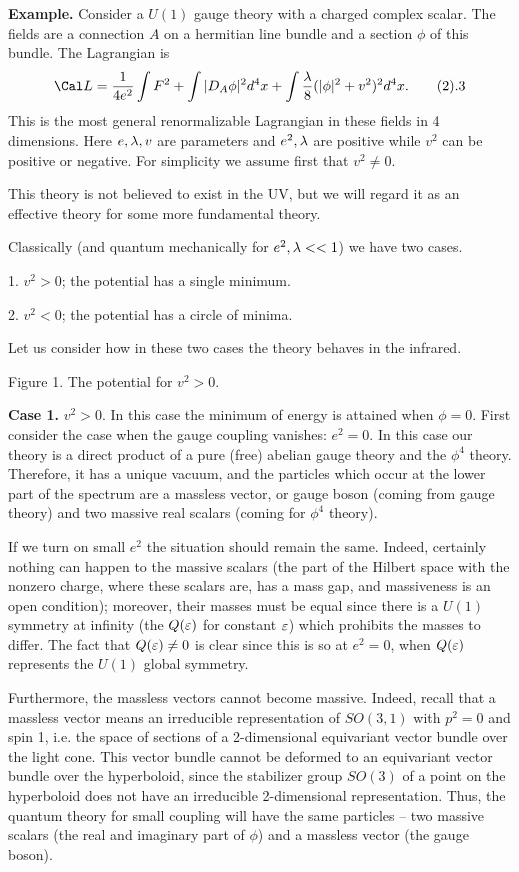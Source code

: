 {\bf Example.} Consider a $U(1)$ gauge theory with a charged 
complex scalar. The fields are a connection $A$ on a hermitian line bundle 
and a section $\phi$ of this bundle. The Lagrangian is 
$$
\Cal L=\frac{1}{4e^2}\int F^2+\int |D_A\phi|^2d^4x+\int\frac{\l}{8}
(|\phi|^2+v^2)^2d^4x.\tag 2.3 
$$
This is the most general renormalizable Lagrangian in these fields in 
4 dimensions. Here $e,\lambda,v$ are parameters and $e^2,\lambda$ are positive while 
$v^2$ can be positive or negative. For simplicity we assume first 
that $v^2\ne 0$. 

This theory is not believed to exist in the UV, but we will regard it 
 as an effective theory for some more fundamental theory. 

Classically (and quantum mechanically for $e^2,\lambda<<1$) we have two cases. 

1. $v^2>0$; the potential has a single minimum. 

2. $v^2<0$; the potential has a circle of minima. 

Let us consider how in these two cases the theory behaves in the infrared. 

\centerline{\epsfxsize=2in}
\centerline{Figure 1. The potential for $v^2>0$.}

\bigskip

{\bf Case 1.} $v^2>0$. In this case the minimum of energy is attained when 
$\phi=0$. First consider the case when the gauge coupling vanishes: 
$e^2=0$. In this case our theory is a direct product of a pure (free) 
abelian gauge theory and the $\phi^4$ theory. Therefore, it has a unique 
vacuum, and    
the particles which occur at the lower part of the spectrum are 
a massless vector, or gauge boson 
(coming from gauge theory) and two massive real scalars
(coming for $\phi^4$ theory). 

If we turn on small $e^2$ the situation should remain the same. 
Indeed, certainly nothing can happen to the massive scalars 
(the part of the Hilbert space 
with the nonzero charge, where these scalars are, has a mass gap, and 
massiveness is an open condition); moreover, their masses must be equal since 
there is a $U(1)$ symmetry at infinity (the $Q(\varepsilon)$ for constant $\varepsilon$)
which prohibits the masses to differ. The fact that $Q(\varepsilon)\ne 0$ 
is clear since this is so at $e^2=0$, when $Q(\varepsilon)$ represents the $U(1)$ 
global symmetry. 

Furthermore, the massless vectors cannot become massive. 
Indeed, recall that a massless vector means an irreducible 
representation of $SO(3,1)$ with $p^2=0$ and spin 1, i.e. the space of 
sections of a 2-dimensional equivariant vector bundle over the light cone.
This vector bundle cannot be deformed to an equivariant vector bundle over 
the hyperboloid, since the stabilizer group $SO(3)$ of a point on the 
hyperboloid does not have an irreducible 2-dimensional representation. 
 Thus, the quantum theory for small coupling 
will have the same particles -- two massive scalars 
(the real and imaginary part of $\phi$) and a massless vector
(the gauge boson).  


